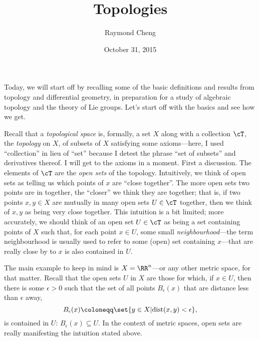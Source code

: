 \documentclass{axolotl}
\title{Topologies}
\author{Raymond Cheng}
\date{October 31, 2015}
\begin{document}
\maketitle
Today, we will start off by recalling some of the basic definitions and results
from topology and differential geometry, in preparation for a study of
algebraic topology and the theory of Lie groups. Let's start off with the
basics and see how we get.

\label{10-31.1}
Recall that a \textit{topological space} is, formally, a set \(X\) along with a
collection \(\cT\), the \textit{topology} on \(X\), of subsets of \(X\)
satisfying some axioms---here, I used ``collection'' in lieu of ``set'' because
I detest the phrase ``set of subsets'' and derivatives thereof. I will get to
the axioms in a moment. First a discussion. The elements of \(\cT\) are the
\textit{open sets} of the topology. Intuitively, we think of open sets as
telling us which points of \(x\) are ``close together''. The more open sets two
points are in together, the ``closer'' we think they are together; that is, if
two points \(x,y \in X\) are mutually in many open sets \(U \in \cT\) together,
then we think of \(x,y\) as being very close together. This intuition is a bit
limited; more accurately, we should think of an open set \(U \in \cT\) as being
a set containing points of \(X\) such that, for each point \(x \in U\), some
small \textit{neighbourhood}---the term neighbourhood is usually used to refer
to some (open) set containing \(x\)---that are really close by to \(x\) is also
contained in \(U\).

The main example to keep in mind is \(X = \RR^n\)---or any other metric space,
for that matter. Recall that the open sets \(U\) in \(X\) are those for which,
if \(x \in U\), then there is some \(\epsilon > 0\) such that the set of all
points \(B_\epsilon(x)\) that are distance less than \(\epsilon\) away, \[
  B_\epsilon(x) \coloneqq \set{y \in X | \mathrm{dist}(x,y) < \epsilon}, \] is
contained in \(U\): \(B_\epsilon(x) \subseteq U\). In the context of metric
spaces, open sets are really manifesting the intuition stated above.
\end{document}
